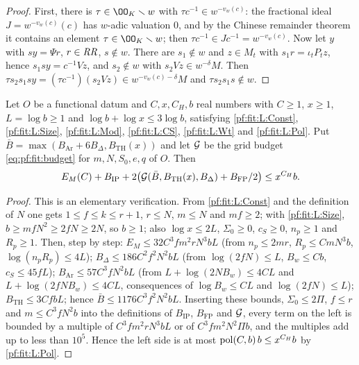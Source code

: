 \begin{proof}
First, there is $\tau\in\OO_K\smallsetminus w$ with $\tau c^{-1}\in w^{-v_w(c)}$: the fractional ideal
$J=w^{-v_w(c)}(c)$ has $w$-adic valuation $0$, and by the Chinese remainder theorem it contains an element
$\tau\in\OO_K\smallsetminus w$; then $\tau c^{-1}\in Jc^{-1}=w^{-v_w(c)}$. Now let $y$ with $sy=\Psi r$, $r\in\mathit{RR}$,
$s\notin w$. There are $s_1\notin w$ and $z\in M_t$ with $s_1r=\iota_tP_tz$, hence $s_1sy=c^{-1}Vz$, and $s_2\notin w$
with $s_2Vz\in w^{-\delta}M$. Then $\tau s_2s_1sy=(\tau c^{-1})(s_2Vz)\in w^{-v_w(c)-\delta}M$ and $\tau s_2s_1s\notin w$.
\end{proof}

\begin{lemma}\label{pf:fit:size}
Let $O$ be a functional datum and $C,x,C_H,b$ real numbers with $C\ge1$, $x\ge1$, $L=\log b\ge1$ and
$\log b+\log x\le3\log b$, satisfying \ref{pf:fit:L:Const}, \ref{pf:fit:L:Size}, \ref{pf:fit:L:Mod}, \ref{pf:fit:L:CS},
\ref{pf:fit:L:Wt} and \ref{pf:fit:L:Pol}. Put $\bar B=\max(B_{\mathrm{Ar}}+6B_\Delta,B_{\mathrm{TH}}(x))$ and let
$\mathcal{G}$ be the grid budget \eqref{eq:pf:fit:budget} for $m,N,S_0,e,q$ of $O$. Then
\[
E_M(C)+B_{\mathrm{IP}}+2\bigl(\mathcal{G}(\bar B,B_{\mathrm{TH}}(x),B_\Delta)+B_{\mathrm{FP}}/2\bigr)\le x^{C_H}b.
\]
\end{lemma}

\begin{proof}
This is an elementary verification. From \ref{pf:fit:L:Const} and the definition of $N$ one gets $1\le f\le k\le r+1$,
$r\le N$, $m\le N$ and $mf\ge2$; with \ref{pf:fit:L:Size}, $b\ge mfN^2\ge2fN\ge2N$, so $b\ge1$; also
$\log x\le2L$, $\Sigma_0\ge0$, $c_S\ge0$, $n_p\ge1$ and $R_p\ge1$. Then, step by step:
$E_M\le32C^3fm^2rN^3bL$ (from $n_p\le2mr$, $R_p\le CmN^3b$, $\log(n_pR_p)\le4L$);
$B_\Delta\le186C^2f^2N^2bL$ (from $\log(2fN)\le L$, $B_w\le Cb$, $c_S\le45fL$);
$B_{\mathrm{Ar}}\le57C^3fN^2bL$ (from $L+\log(2NB_w)\le4CL$ and $L+\log(2fNB_w)\le4CL$, consequences of
$\log B_w\le CL$ and $\log(2fN)\le L$); $B_{\mathrm{TH}}\le3CfbL$; hence $\bar B\le1176C^3f^2N^2bL$. Inserting these
bounds, $\Sigma_0\le2\Pi$, $f\le r$ and $m\le C^3fN^2b$ into the definitions of $B_{\mathrm{IP}}$, $B_{\mathrm{FP}}$ and
$\mathcal{G}$, every term on the left is bounded by a multiple of $C^3fm^2rN^3bL$ or of $C^3fm^2N^2\Pi b$, and the
multiples add up to less than $10^5$. Hence the left side is at most $\operatorname{pol}(C,b)\,b\le x^{C_H}b$ by
\ref{pf:fit:L:Pol}.
\end{proof}

